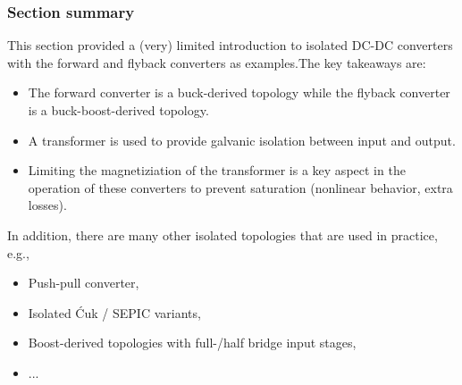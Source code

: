 \begin{frame}
    \frametitle{Section summary}
    This section provided a (very) limited introduction to isolated DC-DC converters with the forward and flyback converters as examples.\pause The key takeaways are:
    \begin{itemize}
        \item The forward converter is a buck-derived topology while the flyback converter is a buck-boost-derived topology.\pause
        \item A transformer is used to provide galvanic isolation between input and output.\pause
        \item Limiting the magnetiziation of the transformer is a key aspect in the operation of these converters to prevent saturation (nonlinear behavior, extra losses).
    \end{itemize}\pause
    In addition, there are many other isolated topologies that are used in practice, e.g., 
    \begin{itemize}
        \item Push-pull converter,
        \item Isolated Ćuk / SEPIC variants, 
        \item Boost-derived topologies with full-/half bridge input stages,
        \item ...
    \end{itemize}
\end{frame}